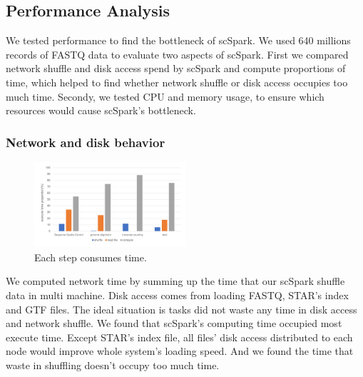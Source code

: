 \documentclass[conference]{IEEEtran}
\begin{document}
  \subsection{Performance Analysis}
  We tested performance to find the bottleneck of scSpark.
  We used 640 millions records of FASTQ data to evaluate two aspects of scSpark.
  First we compared network shuffle and disk access spend by scSpark and compute proportions of time, which helped to find whether network shuffle or disk access occupies too much time.
  Secondy, we tested CPU and memory usage, to ensure which resources would cause scSpark's bottleneck.
  
  \subsubsection{Network and disk behavior}
  \begin{figure}
    \includegraphics[width=0.5\textwidth]{fig7.pdf}
    \caption{Each step consumes time.} \label{fig7}
  \end{figure}
  We computed network time by summing up the time that our scSpark shuffle data in multi machine. 
  Disk access comes from loading FASTQ, STAR's index and GTF files. 
  The ideal situation is tasks did not waste any time in disk access and network shuffle. 
  We found that scSpark's computing time occupied most execute time. 
  Except STAR's index file, all files' disk access distributed to each node would improve whole system's loading speed. 
  And we found the time that waste in shuffling doesn't occupy too much time. 
  
\end{document}
